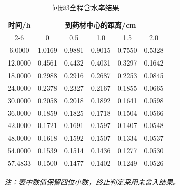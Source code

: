\begin{table}[H]
    \centering
    \small
    \renewcommand{\arraystretch}{0.85} %

    \caption{问题3全程含水率结果}
    \label{tab:q3-results}

    \begin{tabular*}{0.82\textwidth}
        {@{\extracolsep{\fill}}cccccc@{}}
        \toprule
        \multirow{2}{*}{时间/h}
        & \multicolumn{5}{c}{到药材中心的距离/cm} \\
        \cmidrule(lr){2-6}
        & 0 & 0.5 & 1.0 & 1.5 & 2.0 \\
        \midrule

        6.0000  & 1.0169 & 0.9881 & 0.9015 & 0.7550 & 0.5328 \\
        12.0000 & 0.4561 & 0.4432 & 0.4031 & 0.3297 & 0.1642 \\
        18.0000 & 0.2988 & 0.2916 & 0.2687 & 0.2253 & 0.0845 \\
        24.0000 & 0.2378 & 0.2327 & 0.2167 & 0.1855 & 0.0665 \\
        30.0000 & 0.2058 & 0.2018 & 0.1892 & 0.1641 & 0.0598 \\
        36.0000 & 0.1859 & 0.1825 & 0.1718 & 0.1504 & 0.0566 \\
        42.0000 & 0.1721 & 0.1691 & 0.1597 & 0.1407 & 0.0548 \\
        48.0000 & 0.1618 & 0.1592 & 0.1507 & 0.1334 & 0.0537 \\
        54.0000 & 0.1539 & 0.1514 & 0.1436 & 0.1277 & 0.0530 \\
        57.4833 & 0.1500 & 0.1477 & 0.1402 & 0.1249 & 0.0526 \\

        \bottomrule
    \end{tabular*}

    \vspace{2pt}
    
    \parbox{0.82\textwidth}{%
        \footnotesize\itshape
        注：表中数值保留四位小数，终止判定采用未舍入结果。
    }
\end{table}